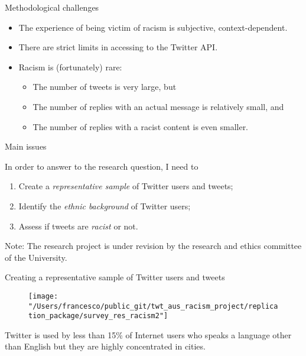 \documentclass[serif, aspectratio=169]{beamer}
\begin{document}
\begin{frame}
{Methodological challenges}

\begin{itemize}

\item The experience of being victim of racism is subjective, context-dependent. 

\item There are strict limits in accessing to the Twitter API.

\item Racism is (fortunately) rare:

\begin{itemize}

\item The number of tweets is very large, but

\item The number of replies with an actual message is relatively small, and

\item The number of replies with a racist content is even smaller. 

\end{itemize}

\end{itemize}



\end{frame}

\begin{frame}
{Main issues}

In order to answer to the research question, I need to

\begin{enumerate}

\item Create a \textit{representative sample} of Twitter users and tweets;

\item Identify the \textit{ethnic background} of Twitter users;

\item Assess if tweets are \textit{racist} or not.

\end{enumerate}

Note: The research project is under revision by the research and ethics committee of the University.

\end{frame}

\begin{frame}
{Creating a representative sample of Twitter users and tweets}

\begin{figure}
\texttt{[image: "/Users/francesco/public\_git/twt\_aus\_racism\_project/replication\_package/survey\_res\_racism2"]}
\end{figure}

Twitter is used by less than 15\% of Internet users who speaks a language other than English but they are highly concentrated in cities. 


\end{frame}
\end{document}
